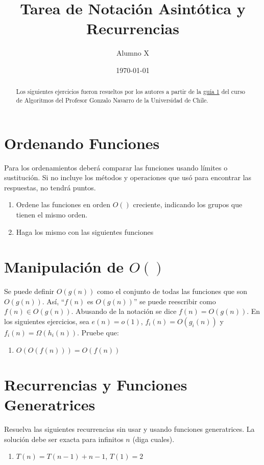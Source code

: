 \documentclass{practicaEPCC}
\title{Tarea de Notación Asintótica y Recurrencias}
\author{Alumno X}
\date{\today}
\begin{document}
\maketitle
\begin{abstract}
Los siguientes ejercicios fueron resueltos por los autores a partir de la \href{https://users.dcc.uchile.cl/~gnavarro/cc40a/guia1.ps.gz}{guía 1} del curso de Algoritmos del Profesor Gonzalo Navarro de la Universidad de Chile.
    
\end{abstract}
\section{Ordenando Funciones}
Para los ordenamientos deberá comparar las funciones usando límites o sustitución. Si no incluye los métodos y operaciones que usó para encontrar las respuestas, no tendrá puntos.
\begin{enumerate}
    \item Ordene las funciones en orden $O()$ creciente, indicando los grupos que tienen el mismo orden.
    \item Haga los mismo con las siguientes funciones

\end{enumerate}

\section{Manipulación de $O()$}
Se puede definir $O(g(n))$ como el conjunto de todas las funciones que son $O(g(n))$. Así, ``$f(n)$ es $O(g(n))$'' se puede reescribir como $f(n) \in O(g(n))$. Abusando de la notación se dice $f(n)=O(g(n))$.
En los siguientes ejercicios, sea $e(n) = o(1)$, $f_i(n) = O(g_i(n))$ y $f_i(n) = \Omega(h_i(n))$. Pruebe que:

\begin{enumerate}
    \item $O(O(f(n))) = O(f(n))$
\end{enumerate}

\section{Recurrencias y Funciones Generatrices}
Resuelva las siguientes recurrencias sin usar y usando funciones generatrices. La solución debe ser exacta para infinitos $n$ (diga cuales).

\begin{enumerate}
    \item $T(n) = T(n - 1) + n - 1$, $T(1) = 2$
\end{enumerate}
\end{document}
